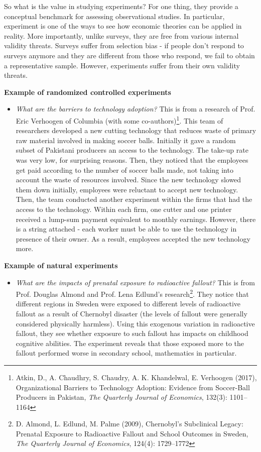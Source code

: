 \documentclass[12pt]{article}
\theoremstyle{definition}
\theoremstyle{property}
\theoremstyle{assumption}
\theoremstyle{example}
\theoremstyle{comment}
\begin{document}
So what is the value in studying experiments? For one thing, they provide a conceptual benchmark for assessing observational studies. In particular, experiment is one of the ways to see how economic theories can be applied in reality. More importantly, unlike surveys, they are free from various internal validity threats. Surveys suffer from selection bias - if people don't respond to surveys anymore and they are different from those who respond, we fail to obtain a representative sample. However, experiments suffer from their own validity threats. 
\begin{mdframed}[backgroundcolor =blue!10]
\textbf{Example of randomized controlled experiments}
\begin{itemize}
\item \textit{What are the barriers to technology adoption?} This is from a research of Prof. Eric Verhoogen of Columbia (with some co-authors)\footnote{\scriptsize{Atkin, D., A. Chaudhry, S. Chaudry, A. K. Khandelwal, E. Verhoogen (2017), Organizational Barriers to Technology Adoption: Evidence from Soccer-Ball Producers in Pakistan, \textit{The Quarterly Journal of Economics}, 132(3): 1101–1164}}. This team of researchers developed a new cutting technology that reduces waste of primary raw material involved in making soccer balls. Initially it gave a random subset of Pakistani producers an access to the technology. The take-up rate was very low, for surprising reasons. Then, they noticed that the employees get paid according to the number of soccer balls made, not taking into account the waste of resources involved. Since the new technology slowed them down initially, employees were reluctant to accept new technology. Then, the team conducted another experiment within the firms that had the access to the technology. Within each firm, one cutter and one printer received a lump-sum payment equivalent to monthly earnings. However, there is a string attached - each worker must be able to use the technology in presence of their owner. As a result, employees accepted the new technology more. \par\medskip
\noindent
\end{itemize}
\textbf{Example of natural experiments}
\begin{itemize}
\item \textit{What are the impacts of prenatal exposure to radioactive fallout?} This is from Prof. Douglas Almond and Prof. Lena Edlund's research\footnote{\scriptsize{D. Almond, L. Edlund, M. Palme (2009), Chernobyl's Subclinical Legacy: Prenatal Exposure to Radioactive Fallout and School Outcomes in Sweden, \textit{The Quarterly Journal of Economics}, 124(4): 1729–1772}}. They notice that different regions in Sweden were exposed to different levels of radioactive fallout as a result of Chernobyl disaster (the levels of fallout were generally considered physically harmless). Using this exogenous variation in radioactive fallout, they see whether exposure to such fallout has impacts on childhood cognitive abilities. The experiment reveals that those exposed more to the fallout performed worse in secondary school, mathematics in particular.  

\end{itemize}
\end{mdframed}
\end{document}
